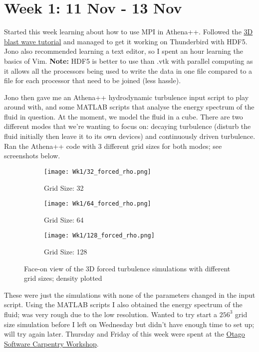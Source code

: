 \documentclass[12pt,letterpaper]{article}
\begin{document}
  \thispagestyle{firststyle}
  \section*{Week 1: 11 Nov - 13 Nov}

  Started this week learning about how to use MPI in Athena++. Followed the \href{https://github.com/PrincetonUniversity/athena-public-version/wiki/Running-3D-MHD-with-OpenMP-and-MPI}{3D blast wave tutorial} and managed to get it working on Thunderbird with HDF5. Jono also recommended learning a text editor, so I spent an hour learning the basics of Vim. \textbf{Note:} HDF5 is better to use than .vtk with parallel computing as it allows all the processors being used to write the data in one file compared to a file for each processor that need to be joined (less hassle).

  Jono then gave me an Athena++ hydrodynamic turbulence input script to play around with, and some MATLAB scripts that analyse the energy spectrum of the fluid in question. At the moment, we model the fluid in a cube. There are two different modes that we're wanting to focus on: decaying turbulence (disturb the fluid initially then leave it to its own devices) and continuously driven turbulence. Ran the Athena++ code with 3 different grid sizes for both modes; see screenshots below.

  \begin{figure}[!h]
   \centering
  \begin{subfigure}{0.3\textwidth}
  \texttt{[image: Wk1/32\_forced\_rho.png]}
  \caption{Grid Size: 32}
  \label{fig:32rho}
  \end{subfigure}
  \begin{subfigure}{0.3\textwidth}
  \texttt{[image: Wk1/64\_forced\_rho.png]}
  \caption{Grid Size: 64}
  \label{fig:64rho}
  \end{subfigure}
  \begin{subfigure}{0.3\textwidth}
  \texttt{[image: Wk1/128\_forced\_rho.png]}
  \caption{Grid Size: 128}
  \label{fig:128rho}
  \end{subfigure}

  \caption{Face-on view of the 3D forced turbulence simulations with different grid sizes; density plotted}
  \label{fig:forcedturb}
  \end{figure}

  These were just the simulations with none of the parameters changed in the input script. Using the MATLAB scripts I also obtained the energy spectrum of the fluid; was very rough due to the low resolution. Wanted to try start a $256^3$ grid size simulation before I left on Wednesday but didn't have enough time to set up; will try again later. Thursday and Friday of this week were spent at the \href{https://otagocarpentries.github.io/2019-11-14-otago/}{Otago Software Carpentry Workshop}.
\end{document}
